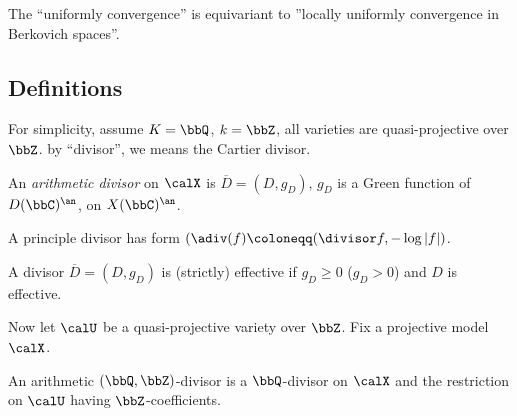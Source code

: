 \begin{remark}[label=\labelNFM{rmk:begin}, status=draft, tag=0000000]
	The ``uniformly convergence'' is equivariant to ''locally uniformly convergence in Berkovich spaces''.
\end{remark}



\subsection[status=draft,tag=0000000,label=\labelNFM{subsec:defsection}]{Definitions}

For simplicity, assume $K = \bbQ$, $k = \bbZ$, all varieties are quasi-projective over $\bbZ$.
by ``divisor'', we means the Cartier divisor.


\begin{definition}[label=\labelNFM{def:defdef}, status=draft, tag=0000000]
	An \emph{arithmetic divisor} on $\calX$ is $\overline{D} = (D,g_D)$, $g_D$ is a Green function of $D(\bbC)^\an$, on $X(\bbC)^\an$.

	A principle divisor has form $(\adiv (f) \coloneqq (\divisor f, - \log |f|)$.

	A divisor $\overline{D} = (D,g_D)$ is (strictly) effective if $g_D \geq 0$ ($g_D > 0$) and $D$ is effective.
\end{definition}


Now let $\calU$ be a quasi-projective variety over $\bbZ$.
Fix a projective model $\calX$.

An arithmetic $(\bbQ,\bbZ)$-divisor is a $\bbQ$-divisor on $\calX$ and the restriction on $\calU$ having $\bbZ$-coefficients.





























